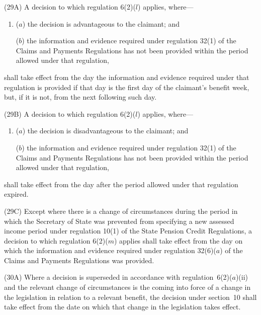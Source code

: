 \documentclass[12pt,a4paper]{article}
\begin{document}
(29A) A decision to which regulation 6(2)($l$)  applies, where—
\begin{enumerate}\item[]
($a$) the decision is advantageous to the claimant; and

($b$) the information and evidence required under regulation 32(1) of the Claims and Payments Regulations has not been provided within the period allowed under that regulation,
\end{enumerate}
shall take effect from the day the information and evidence required under that regulation is provided if that day is the first day of the claimant’s benefit week, but, if it is not, from the next following such day.

(29B) A decision to which regulation 6(2)($l$)  applies, where—
\begin{enumerate}\item[]
($a$) the decision is disadvantageous to the claimant; and

($b$) the information and evidence required under regulation 32(1) of the Claims and Payments Regulations has not been provided within the period allowed under that regulation,
\end{enumerate}
shall take effect from the day after the period allowed under that regulation expired.

(29C) Except where there is a change of circumstances during the period in which the Secretary of State was prevented from specifying a new assessed income period under regulation 10(1) of the State Pension Credit Regulations, a decision to which regulation 6(2)($m$)  applies shall take effect from the day on which the information and evidence required under regulation 32(6)($a$)  of the Claims and Payments Regulations was provided.


\begin{sloppypar}
(30A) Where a decision is superseded in accordance with regulation~6(2)($a$)(ii) and the relevant change of circumstances is the coming into force of a change in the legislation in relation to a relevant benefit, the decision under section~10 shall take effect from the date on which that change in the legislation takes effect.
\end{sloppypar}
\end{document}
